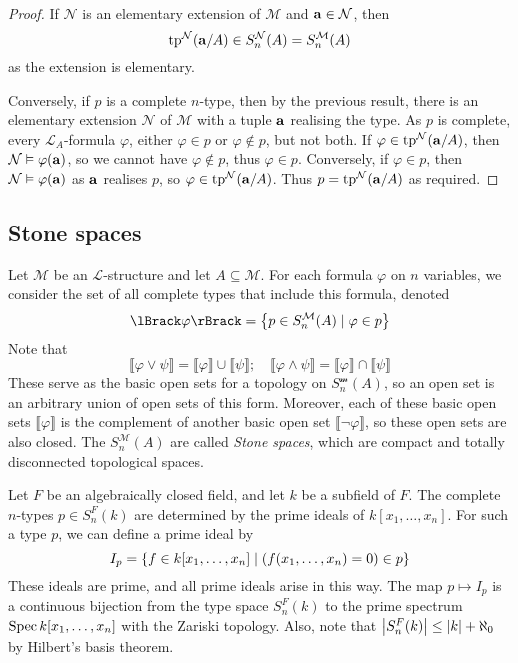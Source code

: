 \begin{proof}
    If \( \mathcal N \) is an elementary extension of \( \mathcal M \) and \( \vb a \in \mathcal N \), then
    \[ \operatorname{tp}^{\mathcal N}(\vb a/A) \in S_n^{\mathcal N}(A) = S_n^{\mathcal M}(A) \]
    as the extension is elementary.

    Conversely, if \( p \) is a complete \( n \)-type, then by the previous result, there is an elementary extension \( \mathcal N \) of \( \mathcal M \) with a tuple \( \vb a \) realising the type.
    As \( p \) is complete, every \( \mathcal L_A \)-formula \( \varphi \), either \( \varphi \in p \) or \( \varphi \notin p \), but not both.
    If \( \varphi \in \operatorname{tp}^{\mathcal N}(\vb a/A) \), then \( \mathcal N \vDash \varphi(\vb a) \), so we cannot have \( \varphi \notin p \), thus \( \varphi \in p \).
    Conversely, if \( \varphi \in p \), then \( \mathcal N \vDash \varphi(\vb a) \) as \( \vb a \) realises \( p \), so \( \varphi \in \operatorname{tp}^{\mathcal N}(\vb a/A) \).
    Thus \( p = \operatorname{tp}^{\mathcal N}(\vb a/A) \) as required.
\end{proof}

\subsection{Stone spaces}
Let \( \mathcal M \) be an \( \mathcal L \)-structure and let \( A \subseteq \mathcal M \).
For each formula \( \varphi \) on \( n \) variables, we consider the set of all complete types that include this formula, denoted
\[ \lBrack\varphi\rBrack = \qty{p \in S_n^{\mathcal M}(A) \mid \varphi \in p} \]
Note that
\[ \lBrack\varphi \vee \psi\rBrack = \lBrack\varphi\rBrack \cup \lBrack\psi\rBrack;\quad \lBrack\varphi \wedge \psi\rBrack = \lBrack\varphi\rBrack \cap \lBrack\psi\rBrack \]
These serve as the basic open sets for a topology on \( S_n^{\mathcal m}(A) \), so an open set is an arbitrary union of open sets of this form.
Moreover, each of these basic open sets \( \lBrack\varphi\rBrack \) is the complement of another basic open set \( \lBrack\neg\varphi\rBrack \), so these open sets are also closed.
The \( S_n^{\mathcal M}(A) \) are called \emph{Stone spaces}, which are compact and totally disconnected topological spaces.
\begin{example}
    Let \( F \) be an algebraically closed field, and let \( k \) be a subfield of \( F \).
    The complete \( n \)-types \( p \in S_n^F(k) \) are determined by the prime ideals of \( k[x_1, \dots, x_n] \).
    For such a type \( p \), we can define a prime ideal by
    \[ I_p = \qty{f \in k[x_1, \dots, x_n] \mid (f(x_1, \dots, x_n) = 0) \in p} \]
    These ideals are prime, and all prime ideals arise in this way.
    The map \( p \mapsto I_p \) is a continuous bijection from the type space \( S_n^F(k) \) to the prime spectrum \( \operatorname{Spec} k[x_1, \dots, x_n] \) with the Zariski topology.
    Also, note that \( \abs{S_n^F(k)} \leq \abs{k} + \aleph_0 \) by Hilbert's basis theorem.
\end{example}

